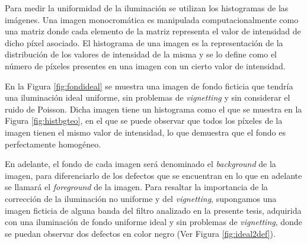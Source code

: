 Para medir la uniformidad de la iluminación se utilizan los histogramas de las imágenes. Una imagen monocromática es manipulada computacionalmente como una matriz donde cada elemento de la matriz representa el valor de intensidad de dicho píxel asociado. El histograma de una imagen es la representación de la distribución de los valores de intensidad de la misma y se lo define como el número de píxeles presentes en una imagen con un cierto valor de intensidad.

En la Figura \ref{fig:fondideal} se muestra una imagen de fondo ficticia que tendría una iluminación ideal uniforme, sin problemas de  \textit{vignetting} y sin considerar el ruido de Poisson. Dicha imagen tiene un histograma como el que se muestra en la Figura \ref{fig:histbgteo}, en el que se puede observar que todos los píxeles de la imagen tienen el mismo valor de intensidad, lo que demuestra que el fondo es perfectamente homogéneo.
	\begin{figure}[H]
		\begin{floatrow}
		\end{floatrow}
	\end{figure}
En adelante, el fondo de cada imagen será denominado el \textit{background} de la imagen, para diferenciarlo de los defectos que se encuentran en lo que en adelante se llamará el \textit{foreground} de la imagen. Para resaltar la importancia de la corrección de la iluminación no uniforme y del \textit{vignetting}, supongamos una imagen ficticia de alguna banda del filtro analizado en la presente tesis, adquirida con una iluminación de fondo uniforme ideal y sin problemas de \textit{vignetting}, donde se puedan observar dos defectos en color negro (Ver Figura \ref{fig:ideal2def}).
